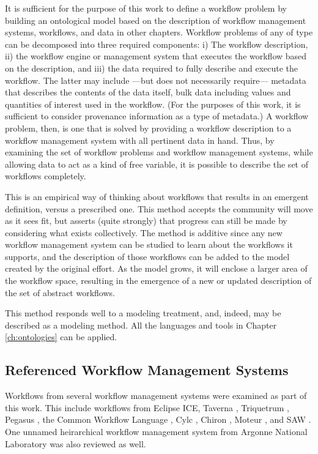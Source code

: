 It is sufficient for the purpose of this work to define a workflow problem
by building an ontological model based on the description of workflow
management systems, workflows, and data in other chapters. Workflow problems of
any of type can be decomposed into three required components: i) The workflow
description, ii) the workflow engine or management system that executes the
workflow based on the description, and iii) the data required to fully describe
and execute the workflow. The latter may include ---but does not necessarily
require--- metadata that describes the contents of the data itself, bulk data
including values and quantities of interest used in the workflow. (For the purposes of
this work, it is sufficient to consider provenance information as a type of
metadata.) A workflow problem, then, is one that is solved by providing a
workflow description to a workflow management system with all pertinent data in
hand. Thus, by examining the set of workflow problems and workflow management
systems, while allowing data to act as a kind of free variable, it is possible
to describe the set of workflows completely.

This is an empirical way of thinking about workflows that results in an emergent
definition, versus a prescribed one. This method accepts the community will
move as it sees fit, but asserts (quite strongly) that progress can still be
made by considering what exists collectively. The method is additive since
any new workflow management system can be studied to learn about the
workflows it supports, and the description of those workflows can be added to
the model created by the original effort. As the model grows, it will enclose a
larger area of the workflow space, resulting in the emergence of a new or
updated description of the set of abstract workflows.

This method responds well to a modeling treatment, and, indeed, may be described
as a modeling method. All the languages and tools in Chapter \ref{ch:ontologies}
can be applied.

\subsection{Referenced Workflow Management Systems}

Workflows from several workflow management systems were examined as part of this
work. This include workflows from Eclipse ICE, Taverna \cite{taverna},
Triquetrum \cite{triquetrum}, Pegasus \cite{pegasus}, the Common Workflow
Language \cite{cwl}, Cylc \cite{cylc}, Chiron \cite{chiron}, Moteur
\cite{Moteur}, and SAW \cite{SAW}. One unnamed heirarchical workflow management
system from Argonne National Laboratory was also reviewed as well.

